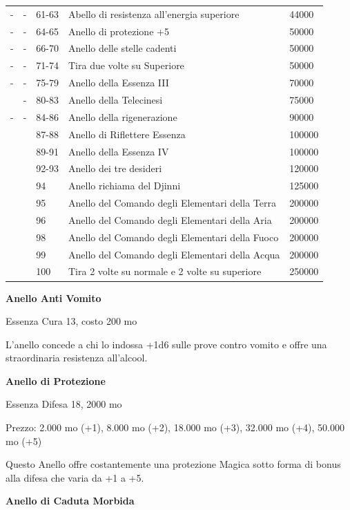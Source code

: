 \documentclass[a4paper,11pt,twoside,openany]{book}
\begin{document}
\begin{tabular}{L{2cm} L{2cm} L{2cm} L{8cm} L{2cm}}
- & - & 61-63 & Abello di resistenza all'energia superiore & 44000\tabularnewline
- & - & 64-65 & Anello di protezione +5 & 50000\tabularnewline
- & - & 66-70 & Anello delle stelle cadenti  & 50000\tabularnewline
- & - & 71-74 & Tira due volte su Superiore & 50000\tabularnewline
- & - & 75-79 & Anello della Essenza III & 70000\tabularnewline
 & - & 80-83 & Anello della Telecinesi  & 75000\tabularnewline
- & - & 84-86 & Anello della rigenerazione & 90000\tabularnewline
 & & 87-88 & Anello di Riflettere Essenza & 100000\tabularnewline
 & & 89-91 & Anello della Essenza IV & 100000\tabularnewline
 & & 92-93 & Anello dei tre desideri  & 120000\tabularnewline
 & & 94 & Anello richiama del Djinni  & 125000\tabularnewline
 & & 95 & Anello del Comando degli Elementari della Terra & 200000\tabularnewline
 & & 96 & Anello del Comando degli Elementari della Aria & 200000\tabularnewline
 & & 98 & Anello del Comando degli Elementari della Fuoco  & 200000\tabularnewline
 & & 99 & Anello del Comando degli Elementari della Acqua  & 200000\tabularnewline
 & & 100 & Tira 2 volte su normale e 2 volte su superiore & 250000\tabularnewline

\end{tabular}

\bigskip

\textbf{Anello Anti Vomito}

Essenza Cura 13, costo 200 mo

L'anello concede a chi lo indossa +1d6 sulle prove contro vomito e offre una straordinaria resistenza all'alcool.

\textbf{Anello di Protezione}

Essenza Difesa 18, 2000 mo

Prezzo: 2.000 mo (+1), 8.000 mo (+2), 18.000 mo (+3), 32.000 mo (+4),
50.000 mo (+5)

Questo Anello offre costantemente una protezione Magica sotto forma di bonus alla difesa che varia da +1 a +5.

\textbf{Anello di Caduta Morbida}
\end{document}
